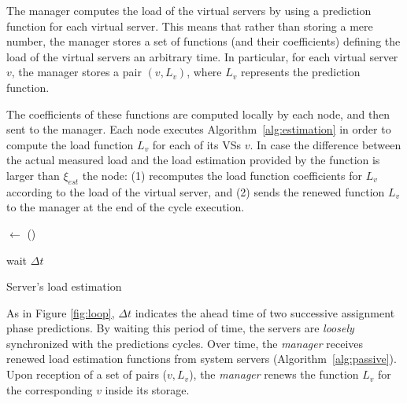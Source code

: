 \documentclass[final,10pt,a5paper]{phdimt}
\newcommand{\timeWait}{\Delta t}
\theoremstyle{definition}
\begin{document}
The manager computes the load of the virtual servers by using a prediction function for each virtual server.
This means that rather than storing a mere number, the manager stores a set of functions (and their coefficients) defining the load of the virtual servers an arbitrary time. In particular, for each virtual server $v$, the manager stores a pair $(v,L_v)$, where $L_v$ represents the prediction function.

The coefficients of these functions are computed locally by each node, and then sent to the manager.
Each node executes Algorithm~\ref{alg:estimation} in order to compute the load function $L_v$ for each of its VSs $v$.
In case the difference between the actual measured load and the load estimation provided by the function is larger than $\xi_{est}$
the node:
(1) recomputes the load function coefficients for $L_v$ according to the load of the virtual server, and 
(2) sends the renewed function $L_v$ to the manager at the end of the cycle execution. 

\begin{algorithm}[tbh]





\Repeat{}
{
{
	\Load $\leftarrow$ \GetLoad()\;
	
}

{
	\Send{\Msg, \ManagerAddress} \;
}

wait $\Delta t$ \;

}

\caption{Server's load estimation} 
\label{alg:estimation}
\end{algorithm}

As in Figure \ref{fig:loop}, $\timeWait$ indicates the ahead time of two successive assignment phase predictions.
By waiting this period of time, the servers are \textit{loosely} synchronized with the predictions cycles.
Over time, the \emph{manager} receives renewed load estimation functions from system servers (Algorithm~\ref{alg:passive}). 
Upon reception of a set of pairs ($v,L_v$), the \emph{manager} renews the function $L_v$ for the corresponding $v$ inside its storage. 
\end{document}
